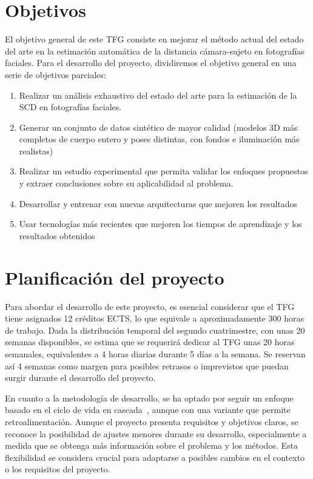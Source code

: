 \section{Objetivos}
El objetivo general de este TFG consiste en mejorar el método actual del estado del arte en la estimación automática de la distancia cámara-sujeto en fotografías faciales. Para el desarrollo del proyecto, dividiremos el objetivo general en una serie de objetivos parciales:
\begin{enumerate}
    \item Realizar un análisis exhaustivo del estado del arte para la estimación de la SCD en fotografías faciales.
    \item Generar un conjunto de datos sintético de mayor calidad (modelos 3D más completos de cuerpo entero y poses distintas, con fondos e iluminación más realistas)
    \item Realizar un estudio experimental que permita validar los enfoques propuestos y extraer conclusiones sobre su aplicabilidad al problema.
    \item Desarrollar y entrenar con nuevas arquitecturas que mejoren los resultados
    \item Usar tecnologías más recientes que mejoren los tiempos de aprendizaje y los resultados obtenidos
\end{enumerate}

\section{Planificación del proyecto}

Para abordar el desarrollo de este proyecto, es esencial considerar que el TFG tiene asignados 12 créditos ECTS, lo que equivale a aproximadamente 300 horas de trabajo. Dada la distribución temporal del segundo cuatrimestre, con unas 20 semanas disponibles, se estima que se requerirá dedicar al TFG unas 20 horas semanales, equivalentes a 4 horas diarias durante 5 días a la semana. Se reservan así 4 semanas como margen para posibles retrasos o imprevistos que puedan surgir durante el desarrollo del proyecto.

En cuanto a la metodología de desarrollo, se ha optado por seguir un enfoque basado en el ciclo de vida en cascada~\cite{38}, aunque con una variante que permite retroalimentación. Aunque el proyecto presenta requisitos y objetivos claros, se reconoce la posibilidad de ajustes menores durante su desarrollo, especialmente a medida que se obtenga más información sobre el problema y los métodos. Esta flexibilidad se considera crucial para adaptarse a posibles cambios en el contexto o los requisitos del proyecto.


